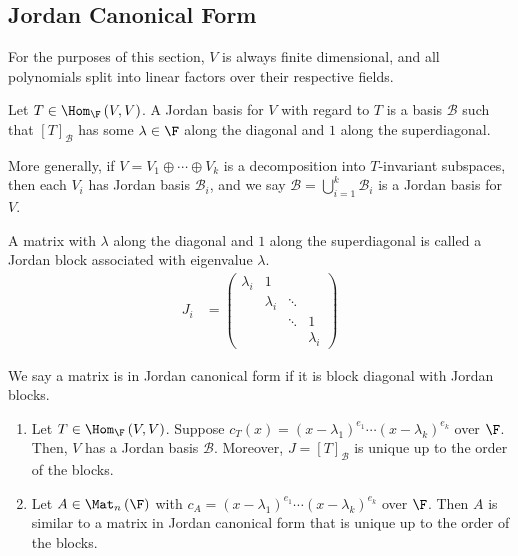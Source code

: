 \documentclass[10pt]{mypackage}
\begin{document}
\subsection{Jordan Canonical Form}%
For the purposes of this section, $V$ is always finite dimensional, and all polynomials split into linear factors over their respective fields.
\begin{definition}
  Let $T\in \Hom_{\F}\left(V,V\right)$. A Jordan basis for $V$ with regard to $T$ is a basis $\mathcal{B}$ such that $\left[T\right]_{\mathcal{B}}$ has some $\lambda \in \F$ along the diagonal and $1$ along the superdiagonal.\newline

  More generally, if $V = V_1\oplus \cdots \oplus V_k$ is a decomposition into $T$-invariant subspaces, then each $V_i$ has Jordan basis $\mathcal{B}_i$, and we say $\mathcal{B} = \bigcup_{i=1}^{k}\mathcal{B}_i$ is a Jordan basis for $V$.
\end{definition}
\begin{definition}
  A matrix with $\lambda$ along the diagonal and $1$ along the superdiagonal is called a Jordan block associated with eigenvalue $\lambda$.
  \begin{align*}
    J_i &= \begin{pmatrix}
\lambda_i & 1            & \;     & \;  \\
\;        & \lambda_i    & \ddots & \;  \\
\;        & \;           & \ddots & 1   \\
\;        & \;           & \;     & \lambda_i       
\end{pmatrix}
  \end{align*}
\end{definition}
\begin{definition}
  We say a matrix is in Jordan canonical form if it is block diagonal with Jordan blocks.
\end{definition}
\begin{theorem}\hfill
  \begin{enumerate}[(1)]
    \item Let $T\in \Hom_{\F}\left(V,V\right)$. Suppose $c_T(x) = \left(x-\lambda_1\right)^{e_1}\cdots \left(x-\lambda_k\right)^{e_k}$ over $\F$. Then, $V$ has a Jordan basis $\mathcal{B}$. Moreover, $J = \left[T\right]_{\mathcal{B}}$ is unique up to the order of the blocks.
    \item Let $A\in \Mat_{n}\left(\F\right)$ with $c_A = \left(x-\lambda_1\right)^{e_1}\cdots \left(x-\lambda_k\right)^{e_k}$ over $\F$. Then $A$ is similar to a matrix in Jordan canonical form that is unique up to the order of the blocks.
  \end{enumerate}
\end{theorem}
\end{document}
